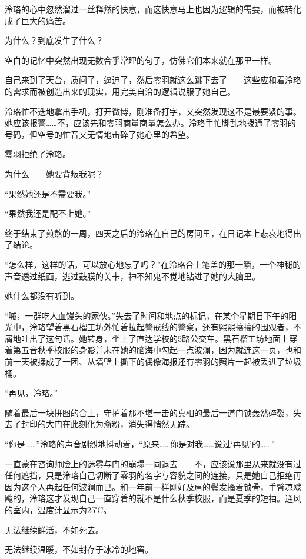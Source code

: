 \documentclass[UTF8, scheme = chinese, openany]{ctexbook}
\begin{document}
泠珞的心中忽然溜过一丝释然的快意，而这快意马上也因为逻辑的需要，而被转化成了巨大的痛苦。

为什么？到底发生了什么？

空白的记忆中突然出现无数合乎常理的句子，仿佛它们本来就在那里一样。

自己来到了天台，质问了，逼迫了，然后零羽就这么跳下去了——这些应和着泠珞的需求而被创造出来的现实，用完美自洽的逻辑说服了她自己。

泠珞忙不迭地拿出手机，打开微博，刚准备打字，又突然发现这不是最要紧的事。她应该报警……不，应该先和零羽商量商量怎么办。泠珞手忙脚乱地拨通了零羽的号码，但空号的忙音又无情地击碎了她心里的希望。

零羽拒绝了泠珞。

为什么——她要背叛我呢？

“果然她还是不需要我。”

“果然我还是配不上她。”

终于结束了煎熬的一周，四天之后的泠珞在自己的房间里，在日记本上悲哀地得出了结论。

“怎么样，这样的话，可以放心地忘了吗？”在泠珞合上笔盖的那一瞬，一个神秘的声音透过纸面，逃过鼓膜的关卡，神不知鬼不觉地钻进了她的大脑里。

她什么都没有听到。

“嘁，一群吃人血馒头的家伙。”失去了时间和地点的标记，在某个星期日下午的阳光中，泠珞望着黑石榴工坊外忙着拉起警戒线的警察，还有熙熙攘攘的围观者，不屑地吐出了这句话。她转身，坐上了直达学校的5路公交车。黑石榴工坊地面上穿着第五音秋季校服的身影并未在她的脑海中勾起一点波澜，因为就连这一页，也和前一天被揉成了一团、从墙壁上撕下的偶像海报还有零羽的照片一起被丢进了垃圾桶。

\vspace{1.5em}

“再见，泠珞。”

随着最后一块拼图的合上，守护着那不堪一击的真相的最后一道门锁轰然碎裂，失去了封印的大门在此刻化为齑粉，消失得悄然无踪。

“你是……”泠珞的声音剧烈地抖动着，“原来……你是对我……说过‘再见’的……”

一直蒙在咨询师脸上的迷雾与门的崩塌一同退去——不，应该说那里从来就没有过任何遮挡，只是泠珞自己切断了零羽的名字与容貌之间的连接，只是她自己拒绝再因为这个人再起任何波澜而已。和一年前一样刚好及肩的鬓发搔着锁骨，手臂凉飕飕的，泠珞这才发现自己一直穿着的就不是什么秋季校服，而是夏季的短袖。通风的室内，温度计显示为25℃。

无法继续鲜活，不如死去。

无法继续温暖，不如封存于冰冷的地窖。
\end{document}

